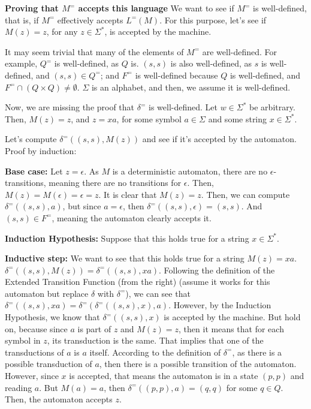 \documentclass[12pt]{article}
\begin{document}
\textbf{Proving that $M^=$ accepts this language}
We want to see if $M^=$ is well-defined, that is, if $M^=$ effectively accepts $L^= (M)$. For this purpose, let's see if $M(z) = z$, for any $z \in \Sigma^*$, is accepted by the machine.

It may seem trivial that many of the elements of $M^=$ are well-defined. For example, $Q^=$ is well-defined, as $Q$ is. $(s,s)$ is also well-defined, as $s$ is well-defined, and $(s,s) \in Q^=$; and $F^=$ is well-defined because $Q$ is well-defined, and $F^= \cap (Q \times Q) \neq \emptyset$. $\Sigma$ is an alphabet, and then, we assume it is well-defined.

Now, we are missing the proof that $\delta^=$ is well-defined. Let $w \in \Sigma^*$ be arbitrary. Then, $M(z) = z$, and $z = xa$, for some symbol $a \in \Sigma$ and some string $x \in \Sigma^*$.

Let's compute $\delta^= ((s,s), M(z))$ and see if it's accepted by the automaton. Proof by induction:

\textbf{Base case:} Let $z = \epsilon$. As $M$ is a deterministic automaton, there are no $\epsilon$-transitions, meaning there are no transitions for $\epsilon$. Then, $M(z) = M(\epsilon) = \epsilon = z$. It is clear that $M(z) = z$. Then, we can compute $\delta^= ((s,s),a)$, but since $a = \epsilon$, then $\delta^= ((s,s),\epsilon) = (s,s)$. And $(s,s) \in F^=$, meaning the automaton clearly accepts it.

\textbf{Induction Hypothesis:} Suppose that this holds true for a string $x \in \Sigma^*$.

\textbf{Inductive step:} We want to see that this holds true for a string $M(z) = xa$. $\delta^= ((s,s), M(z)) = \delta^= ((s,s),xa)$. Following the definition of the Extended Transition Function (from the right) (assume it works for this automaton but replace $\delta$ with $\delta^=$), we can see that $\delta^= ((s,s),xa) = \delta^= (\delta^= ((s,s),x),a)$. However, by the Induction Hypothesis, we know that $\delta^= ((s,s),x)$ is accepted by the machine. But hold on, because since $a$ is part of $z$ and $M(z) = z$, then it means that for each symbol in $z$, its transduction is the same. That implies that one of the transductions of $a$ is $a$ itself. According to the definition of $\delta^=$, as there is a possible transduction of $a$, then there is a possible transition of the automaton. However, since $x$ is accepted, that means the automaton is in a state $(p,p)$ and reading $a$. But $M(a) = a$, then $\delta^= ((p,p),a) = (q,q)$ for some $q \in Q$. Then, the automaton accepts $z$.
\end{document}
